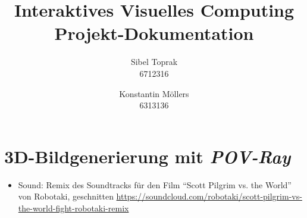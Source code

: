 \documentclass[a4paper,12pt]{article}
\title{\textbf{Interaktives Visuelles Computing}\\Projekt-Dokumentation}
\author{Sibel Toprak\\6712316 \and Konstantin M\"ollers\\6313136}
\def\fremdw#1{{\em #1}\xspace}
\def\Povray{\fremdw{POV-Ray}}
\begin{document}
	\renewcommand{\refname}{Referenzen}
	\maketitle	
	
	
	
	\section{3D-Bildgenerierung mit \Povray}
	
	
	
	
	
	
	
	
	\begin{itemize}
		\item Sound: Remix des Soundtracks für den Film ``Scott Pilgrim vs. the World'' von Robotaki, geschnitten \url{https://soundcloud.com/robotaki/scott-pilgrim-vs-the-world-fight-robotaki-remix}
	\end{itemize}
	
	\nocite{*}
	
	
\end{document}

